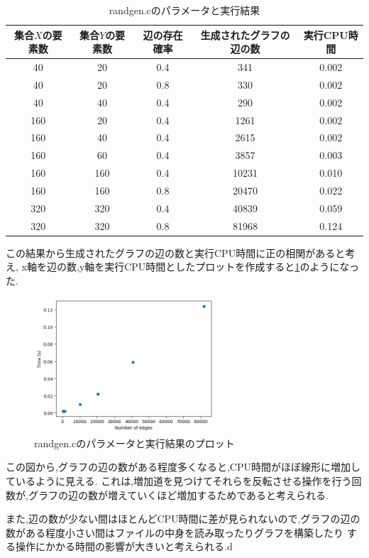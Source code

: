 \documentclass[autodetect-engine, dvi=dvipdfmx, 10pt, a4paper, ja=standard]{bxjsarticle}
\begin{document}
\begin{table}[htbp]
	\centering
	\caption{randgen.cのパラメータと実行結果}
	\label{table:randgen-1}
	\begin{tabular}{@{}ccccc@{}}
		\toprule
		集合$X$の要素数 & 集合$Y$の要素数 & 辺の存在確率 & 生成されたグラフの辺の数 & 実行CPU時間 \\ \midrule
		40        & 20        & 0.4    & 341          & 0.002   \\
		40        & 20        & 0.8    & 330          & 0.002   \\
		40        & 40        & 0.4    & 290          & 0.002   \\
		160       & 20        & 0.4    & 1261         & 0.002   \\
		160       & 40        & 0.4    & 2615         & 0.002   \\
		160       & 60        & 0.4    & 3857         & 0.003   \\
		160       & 160       & 0.4    & 10231        & 0.010   \\
		160       & 160       & 0.8    & 20470        & 0.022   \\
		320       & 320       & 0.4    & 40839        & 0.059   \\
		320       & 320       & 0.8    & 81968        & 0.124   \\ \bottomrule
	\end{tabular}
\end{table}

この結果から生成されたグラフの辺の数と実行CPU時間に正の相関があると考え,
x軸を辺の数,y軸を実行CPU時間としたプロットを作成すると\ref{fig:scatter}のようになった.

\begin{figure}[htbp]
	\centering
	\includegraphics[width=0.6\textwidth]{scat-rand.png}
	\caption{randgen.cのパラメータと実行結果のプロット}
	\label{fig:scatter}
\end{figure}

この図から,グラフの辺の数がある程度多くなると,CPU時間がほぼ線形に増加しているように見える.
これは,増加道を見つけてそれらを反転させる操作を行う回数が,グラフの辺の数が増えていくほど増加するためであると考えられる.

また,辺の数が少ない間はほとんどCPU時間に差が見られないので,グラフの辺の数がある程度小さい間はファイルの中身を読み取ったりグラフを構築したり
する操作にかかる時間の影響が大きいと考えられる.d

\end{document}
